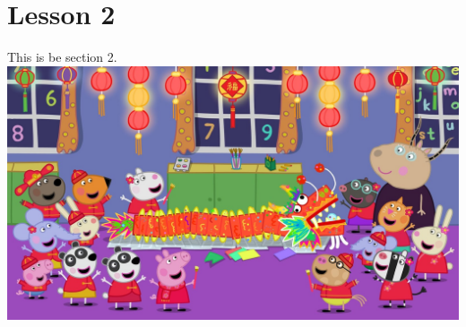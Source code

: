 \documentclass[../main2.tex]{subfiles}
\begin{document}
\section{Lesson 2}

This is be section 2.\\

\includegraphics[width = \linewidth]{images/peppaPig.jpg}
\end{document}
